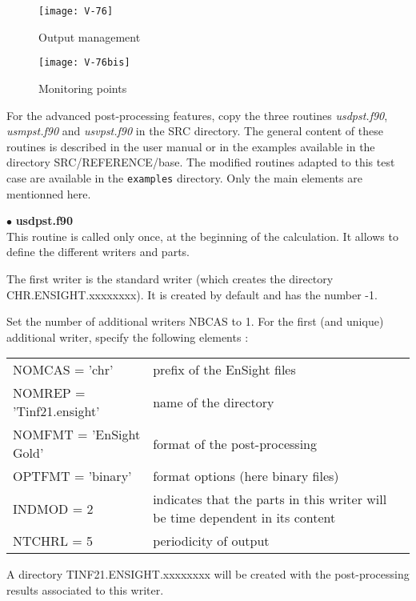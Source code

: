 \begin{figure}[h!]
\begin{center}
\texttt{[image: V-76]}
\caption{Output management}
\label{fig12_e5}
\end{center}
\end{figure}

\begin{figure}[h!]
\begin{center}
\texttt{[image: V-76bis]}
\caption{Monitoring points}
\label{fig12bis_e5}
\end{center}
\end{figure}

\newpage
For the advanced post-processing features, copy the three routines
{\itshape usdpst.f90}, {\itshape usmpst.f90} and {\itshape usvpst.f90} in the SRC
directory. The general content of these routines is described in the user manual
or in the examples available in the directory SRC/REFERENCE/base. The modified
routines adapted to this test case are available in the \texttt{examples}
directory. Only the main elements are mentionned here.



$\bullet$ {\bfseries usdpst.f90}\\
This routine is called only once, at the beginning of the calculation. It allows
to define the different writers and parts.

The first writer is the standard writer (which creates the directory
CHR.ENSIGHT.xxxxxxxx). It is created by default and has the number -1.

Set the number of additional writers NBCAS to 1. For the first (and unique)
additional writer, specify the following elements :\\
\begin{tabular}{@{$\bullet\ $}l@{$\quad$}p{10cm}}
NOMCAS = 'chr' & prefix of the EnSight files\\
NOMREP = 'Tinf21.ensight' & name of the directory\\
NOMFMT = 'EnSight Gold' & format of the post-processing\\
OPTFMT = 'binary' & format options (here binary files)\\
INDMOD = 2 & indicates that the parts in this writer will be time dependent in its content\\
NTCHRL = 5 & periodicity of output\\
\end{tabular}
A directory TINF21.ENSIGHT.xxxxxxxx will be created with the post-processing
results associated to this writer.

